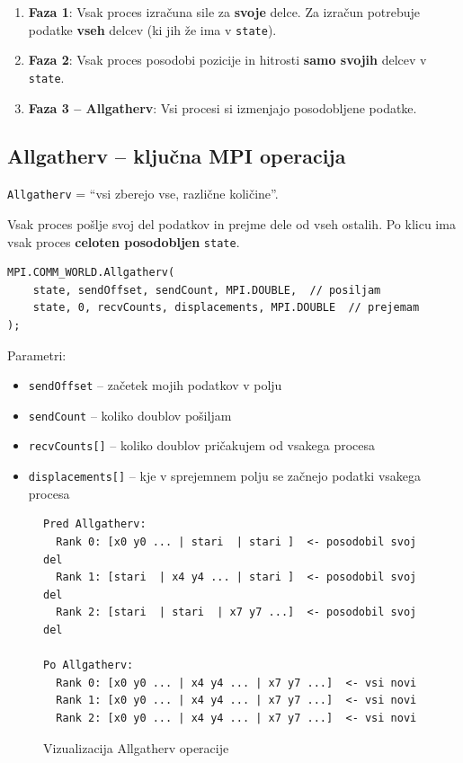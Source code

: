 \documentclass[12pt,a4paper]{article}
\begin{document}
\begin{enumerate}
    \item \textbf{Faza 1}: Vsak proces izra\v{c}una sile za \textbf{svoje} delce. Za izra\v{c}un potrebuje podatke \textbf{vseh} delcev (ki jih \v{z}e ima v \texttt{state}).

    \item \textbf{Faza 2}: Vsak proces posodobi pozicije in hitrosti \textbf{samo svojih} delcev v \texttt{state}.

    \item \textbf{Faza 3 -- Allgatherv}: Vsi procesi si izmenjajo posodobljene podatke.
\end{enumerate}

\subsection{Allgatherv -- klju\v{c}na MPI operacija}

\begin{kljucno}
\texttt{Allgatherv} = ``vsi zberejo vse, razli\v{c}ne koli\v{c}ine''.

Vsak proces po\v{s}lje svoj del podatkov in prejme dele od vseh ostalih. Po klicu ima vsak proces \textbf{celoten posodobljen} \texttt{state}.
\end{kljucno}

\begin{lstlisting}
MPI.COMM_WORLD.Allgatherv(
    state, sendOffset, sendCount, MPI.DOUBLE,  // posiljam
    state, 0, recvCounts, displacements, MPI.DOUBLE  // prejemam
);
\end{lstlisting}

Parametri:
\begin{itemize}
    \item \texttt{sendOffset} -- za\v{c}etek mojih podatkov v polju
    \item \texttt{sendCount} -- koliko doublov po\v{s}iljam
    \item \texttt{recvCounts[]} -- koliko doublov pri\v{c}akujem od vsakega procesa
    \item \texttt{displacements[]} -- kje v sprejemnem polju se za\v{c}nejo podatki vsakega procesa
\end{itemize}

\begin{figure}[h]
\centering
\begin{verbatim}
Pred Allgatherv:
  Rank 0: [x0 y0 ... | stari  | stari ]  <- posodobil svoj del
  Rank 1: [stari  | x4 y4 ... | stari ]  <- posodobil svoj del
  Rank 2: [stari  | stari  | x7 y7 ...]  <- posodobil svoj del

Po Allgatherv:
  Rank 0: [x0 y0 ... | x4 y4 ... | x7 y7 ...]  <- vsi novi
  Rank 1: [x0 y0 ... | x4 y4 ... | x7 y7 ...]  <- vsi novi
  Rank 2: [x0 y0 ... | x4 y4 ... | x7 y7 ...]  <- vsi novi
\end{verbatim}
\caption{Vizualizacija Allgatherv operacije}
\end{figure}
\end{document}
